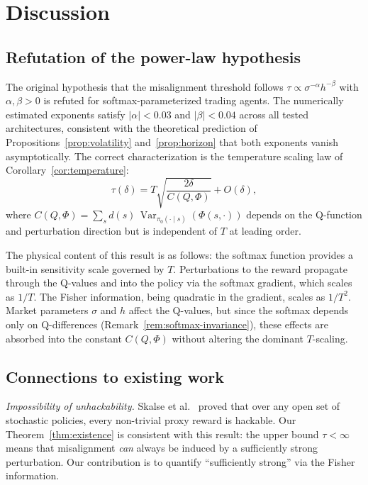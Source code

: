 \section{Discussion}\label{sec:discussion}

\subsection{Refutation of the power-law hypothesis}

The original hypothesis that the misalignment threshold follows
$\tau \propto \sigma^{-\alpha} h^{-\beta}$ with $\alpha, \beta > 0$ is
refuted for softmax-parameterized trading agents. The numerically estimated
exponents satisfy $|\alpha| < 0.03$ and $|\beta| < 0.04$ across all tested
architectures, consistent with the theoretical prediction of
Propositions~\ref{prop:volatility} and~\ref{prop:horizon} that both
exponents vanish asymptotically. The correct characterization is the
temperature scaling law of Corollary~\ref{cor:temperature}:
\begin{equation}\label{eq:correct-form}
\tau(\delta) = T \sqrt{\frac{2\delta}{C(Q,\Phi)}} + O(\delta),
\end{equation}
where $C(Q,\Phi) = \sum_s d(s)\, \operatorname{Var}_{\pi_0(\cdot \mid s)}
(\Phi(s,\cdot))$ depends on the Q-function and perturbation direction but
is independent of $T$ at leading order.

The physical content of this result is as follows: the softmax function
provides a built-in sensitivity scale governed by $T$. Perturbations to
the reward propagate through the Q-values and into the policy via the
softmax gradient, which scales as $1/T$. The Fisher information, being
quadratic in the gradient, scales as $1/T^2$. Market parameters $\sigma$
and $h$ affect the Q-values, but since the softmax depends only on
Q-differences (Remark~\ref{rem:softmax-invariance}), these effects are
absorbed into the constant $C(Q,\Phi)$ without altering the dominant
$T$-scaling.

\subsection{Connections to existing work}

\emph{Impossibility of unhackability.}
Skalse et al.~\cite{skalse2022defining} proved that over any open set of
stochastic policies, every non-trivial proxy reward is hackable. Our
Theorem~\ref{thm:existence} is consistent with this result: the upper
bound $\tau < \infty$ means that misalignment \emph{can} always be induced
by a sufficiently strong perturbation. Our contribution is to quantify
``sufficiently strong'' via the Fisher information.

